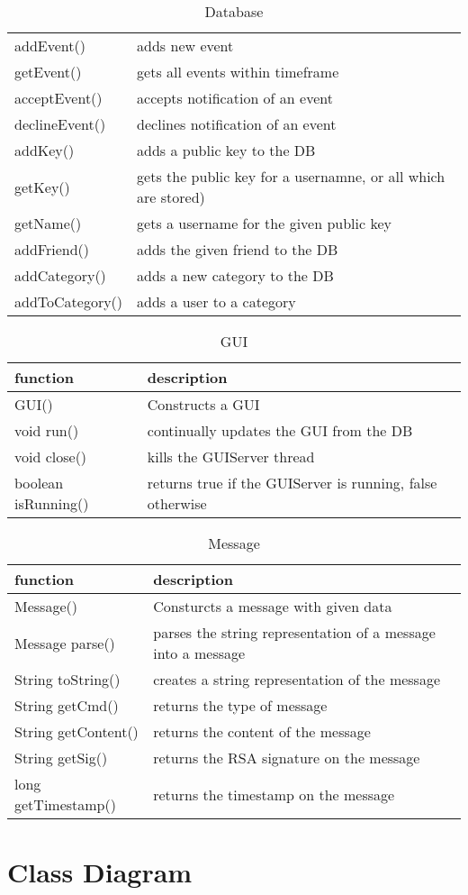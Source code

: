 \begin{table}[h]
\begin{tabular}{p{5cm}p{9cm}}
    addEvent()       & adds new event\\
    getEvent()       & gets all events within timeframe\\
    acceptEvent()    & accepts notification of an event\\
    declineEvent()   & declines notification of an event\\
    
    addKey()         & adds a public key to the DB\\
    getKey()         & gets the public key for a usernamne, or all which are stored)\\
    getName()        & gets a username for the given public key\\

    addFriend()      & adds the given friend to the DB\\
    addCategory()    & adds a new category to the DB\\
    addToCategory()  & adds a user to a category\\
    \end{tabular}
    \caption{Database}
\end{table}

\begin{table}[h]
    \centering
    \begin{tabular}{p{3.6cm}p{9cm}}
    function     & description\\ \hline
    GUI()        & Constructs a GUI\\
    void run()   & continually updates the GUI from the DB\\
    void close() & kills the GUIServer thread\\
    
    boolean isRunning() & returns true if the GUIServer is running, false otherwise\\
    \end{tabular}
    \caption{GUI}
\end{table}

\begin{table}[h]
    \centering
    \begin{tabular}{p{3.6cm}p{9cm}}
    function            & description\\ \hline
    Message()           & Consturcts a message with given data\\
    
    Message parse()     & parses the string representation of a message into a message\\
    
    String toString()   & creates a string representation of the message\\
    String getCmd()     & returns the type of message\\
    String getContent() & returns the content of the message\\
    String getSig()     & returns the RSA signature on the message\\
    long getTimestamp() & returns the timestamp on the message\\
    \end{tabular}
    \caption{Message}
\end{table}

\section{Class Diagram}
